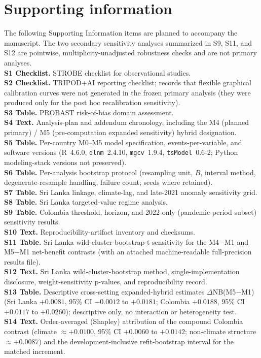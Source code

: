 \documentclass[11pt,a4paper]{article}
\begin{document}
\section*{Supporting information}
\begingroup{}
\noindent The following Supporting Information items are planned to accompany the manuscript. The two secondary sensitivity analyses summarized in S9, S11, and S12 are pointwise, multiplicity-unadjusted robustness checks and are not primary analyses.\\[0.4em]
\noindent\textbf{S1 Checklist.} STROBE checklist for observational studies.\\
\textbf{S2 Checklist.} TRIPOD+AI reporting checklist; records that flexible graphical calibration curves were not generated in the frozen primary analysis (they were produced only for the post hoc recalibration sensitivity).\\
\textbf{S3 Table.} PROBAST risk-of-bias domain assessment.\\
\textbf{S4 Text.} Analysis-plan and addendum chronology, including the M4 (planned primary) / M5 (pre-computation expanded sensitivity) hybrid designation.\\
\textbf{S5 Table.} Per-country M0--M5 model specification, events-per-variable, and software versions (R~4.6.0, \texttt{dlnm}~2.4.10, \texttt{mgcv}~1.9.4, \texttt{tsModel}~0.6-2; Python modeling-stack versions not preserved).\\
\textbf{S6 Table.} Per-analysis bootstrap protocol (resampling unit, $B$, interval method, degenerate-resample handling, failure count; seeds where retained).\\
\textbf{S7 Table.} Sri Lanka linkage, climate-lag, and late-2021 anomaly sensitivity grid.\\
\textbf{S8 Table.} Sri Lanka targeted-value regime analysis.\\
\textbf{S9 Table.} Colombia threshold, horizon, and 2022-only (pandemic-period subset) sensitivity results.\\
\textbf{S10 Text.} Reproducibility-artifact inventory and checksums.\\
\textbf{S11 Table.} Sri Lanka wild-cluster-bootstrap-t sensitivity for the M4$-$M1 and M5$-$M1 net-benefit contrasts (with an attached machine-readable full-precision results file).\\
\textbf{S12 Text.} Sri Lanka wild-cluster-bootstrap method, single-implementation disclosure, weight-sensitivity p-values, and reproducibility record.\\
\textbf{S13 Table.} Descriptive cross-setting expanded-hybrid estimates $\Delta$NB(M5$-$M1) (Sri Lanka $+0.0081$, 95\% CI $-0.0012$ to $+0.0181$; Colombia $+0.0188$, 95\% CI $+0.0117$ to $+0.0260$); descriptive only, no interaction or heterogeneity test.\\
\textbf{S14 Text.} Order-averaged (Shapley) attribution of the compound Colombia contrast (climate $\approx+0.0100$, 95\% CI $+0.0060$ to $+0.0142$; non-climate structure $\approx+0.0087$) and the development-inclusive refit-bootstrap interval for the matched increment.
\endgroup
\end{document}

